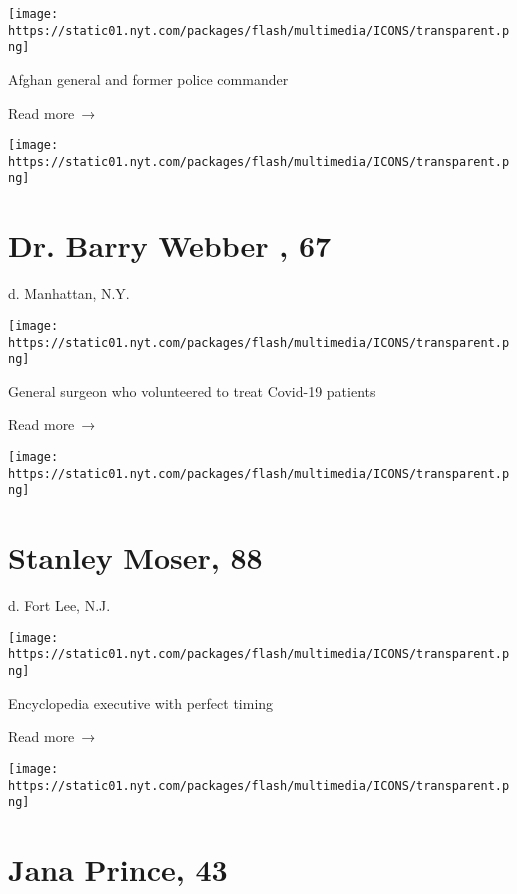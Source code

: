 \texttt{[image: https://static01.nyt.com/packages/flash/multimedia/ICONS/transparent.png]}

Afghan general and former police commander

 Read more~→

\href{https://www.nytimes.com/2020/05/06/obituaries/Dr-barry-webber-dead-coronavirus.html}{}

\texttt{[image: https://static01.nyt.com/packages/flash/multimedia/ICONS/transparent.png]}

\hypertarget{dr-barry-webber--67}{%
\section{Dr. Barry Webber , 67}\label{dr-barry-webber--67}}

d. Manhattan, N.Y.

\texttt{[image: https://static01.nyt.com/packages/flash/multimedia/ICONS/transparent.png]}

General surgeon who volunteered to treat Covid-19 patients

 Read more~→

\href{https://www.nytimes.com/2020/05/06/obituaries/Stanley-Moser-dead-coronavirus.html}{}

\texttt{[image: https://static01.nyt.com/packages/flash/multimedia/ICONS/transparent.png]}

\hypertarget{stanley-moser-88}{%
\section{Stanley Moser, 88}\label{stanley-moser-88}}

d. Fort Lee, N.J.

\texttt{[image: https://static01.nyt.com/packages/flash/multimedia/ICONS/transparent.png]}

Encyclopedia executive with perfect timing

 Read more~→

\href{https://www.nytimes.com/2020/05/06/obituaries/jana-prince-dead-coronavirus.html}{}

\texttt{[image: https://static01.nyt.com/packages/flash/multimedia/ICONS/transparent.png]}

\hypertarget{jana-prince-43}{%
\section{Jana Prince, 43}\label{jana-prince-43}}


